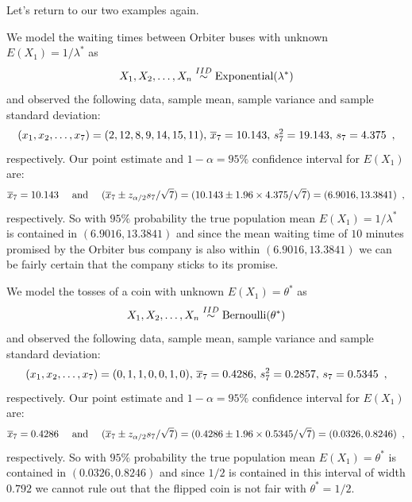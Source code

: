 Let's return to our two examples again.

\begin{example}\label{EgExponentialCIOfMeanWaitingTimesWithSampleMeanAndVar}
We model the waiting times between Orbiter buses with unknown $E(X_1)=1/\lambda^*$ as
\[
X_1,X_2,\ldots,X_n \overset{IID}{\sim} \mbox{{\rm Exponential}}(\lambda^*)
\]
and observed the following data, sample mean, sample variance and sample standard deviation:
\[
(x_1,x_2,\ldots,x_7) = (2,12,8,9,14,15,11), \, \overline{x}_7=10.143, \,  s^2_7 = 19.143, \, s_7 = 4.375 \enspace ,
\] 
respectively.  
Our point estimate and $1-\alpha=95\%$ confidence interval for $E(X_1)$ are:
\[
\overline{x}_7 = 10.143 \quad \text{ and } \quad (\overline{x}_7 \pm z_{\alpha/2} s_7/\sqrt{7}) = (10.143 \pm 1.96 \times 4.375/\sqrt{7}) = (6.9016,13.3841) \enspace ,
\]
respectively.  So with $95\%$ probability the true population mean $E(X_1)=1/\lambda^*$ is contained in $(6.9016,13.3841)$ and since the mean waiting time of $10$ minutes promised by the Orbiter bus company is also within $(6.9016,13.3841)$ we can be fairly certain that the company sticks to its promise.
\end{example}

\begin{example}\label{EgBernoulliCIWithSampleMeanAndVar}
We model the tosses of a coin with unknown $E(X_1)=\theta^*$ as
\[
X_1,X_2,\ldots,X_n \overset{IID}{\sim} \mbox{{\rm Bernoulli}}(\theta^*)
\]
and observed the following data, sample mean, sample variance and sample standard deviation:
\[
(x_1,x_2,\ldots,x_7) = (0,1,1,0,0,1,0), \, \overline{x}_7=0.4286, \,  s^2_7 = 0.2857, \, s_7 = 0.5345 \enspace ,
\] 
respectively.  
Our point estimate and $1-\alpha=95\%$ confidence interval for $E(X_1)$ are:
\[
\overline{x}_7 = 0.4286 \quad \text{ and } \quad (\overline{x}_7 \pm z_{\alpha/2} s_7/\sqrt{7}) = (0.4286 \pm 1.96 \times 0.5345/\sqrt{7}) = (0.0326,0.8246) \enspace ,
\]
respectively.  So with $95\%$ probability the true population mean $E(X_1)=\theta^*$ is contained in $(0.0326,0.8246)$ and since $1/2$ is contained in this interval of width $0.792$ we cannot rule out that the flipped coin is not fair with $\theta^*=1/2$.
\end{example}


